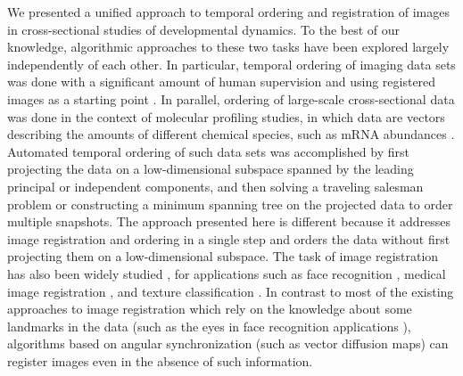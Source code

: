 \documentclass{pnastwo}
\begin{document}
\begin{article}
We presented a unified approach to temporal ordering and registration of images in cross-sectional studies of developmental dynamics. 
%
To the best of our knowledge, algorithmic approaches to these two tasks have been explored largely independently of each other. 
%
In particular, temporal ordering of imaging data sets was done with a significant amount of human supervision and using registered images as a starting point \cite{yuan2014automated, surkova2008characterization}.  
%
In parallel, ordering of large-scale cross-sectional data was done in the context of molecular profiling studies, in which data are vectors describing the amounts of different chemical species, such as mRNA abundances \cite{anavy2014blind, trapnell2014dynamics, gupta2008extracting}. 
%
Automated temporal ordering of such data sets was accomplished by first projecting the data on a low-dimensional subspace spanned by the leading principal or independent components, and then solving a traveling salesman problem or constructing a minimum spanning tree on the projected data to order multiple snapshots. 
%
The approach presented here is different because it addresses image registration and ordering in a single step and orders the data without first projecting them on a low-dimensional subspace. 
%
The task of image registration has also been widely studied \cite{zitova2003image}, for applications such as face recognition \cite{rowley1998rotation}, medical image registration \cite{hajnal2010medical}, and texture classification \cite{greenspan1994rotation}.
%
In contrast to most of the existing approaches to image registration which rely on the knowledge about some landmarks in the data \cite{ian1998statistical} (such as the eyes in face recognition applications \cite{zhao2003face}), algorithms based on angular synchronization (such as vector diffusion maps) can register images even in the absence of such information. 



\end{article}
\end{document}
